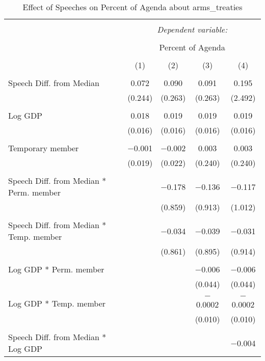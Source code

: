 
\begin{table}[!htbp] \centering 
  \caption{Effect of Speeches on Percent of Agenda about arms_treaties} 
  \label{} 
\begin{tabular}{@{\extracolsep{5pt}}lcccc} 
\\[-1.8ex]\hline 
\hline \\[-1.8ex] 
 & \multicolumn{4}{c}{\textit{Dependent variable:}} \\ 
\cline{2-5} 
\\[-1.8ex] & \multicolumn{4}{c}{Percent of Agenda} \\ 
\\[-1.8ex] & (1) & (2) & (3) & (4)\\ 
\hline \\[-1.8ex] 
 Speech Diff. from Median & 0.072 & 0.090 & 0.091 & 0.195 \\ 
  & (0.244) & (0.263) & (0.263) & (2.492) \\ 
  & & & & \\ 
 Log GDP & 0.018 & 0.019 & 0.019 & 0.019 \\ 
  & (0.016) & (0.016) & (0.016) & (0.016) \\ 
  & & & & \\ 
 Temporary member & $-$0.001 & $-$0.002 & 0.003 & 0.003 \\ 
  & (0.019) & (0.022) & (0.240) & (0.240) \\ 
  & & & & \\ 
 Speech Diff. from Median * Perm. member &  & $-$0.178 & $-$0.136 & $-$0.117 \\ 
  &  & (0.859) & (0.913) & (1.012) \\ 
  & & & & \\ 
 Speech Diff. from Median * Temp. member &  & $-$0.034 & $-$0.039 & $-$0.031 \\ 
  &  & (0.861) & (0.895) & (0.914) \\ 
  & & & & \\ 
 Log GDP * Perm. member &  &  & $-$0.006 & $-$0.006 \\ 
  &  &  & (0.044) & (0.044) \\ 
  & & & & \\ 
 Log GDP * Temp. member &  &  & $-$0.0002 & $-$0.0002 \\ 
  &  &  & (0.010) & (0.010) \\ 
  & & & & \\ 
 Speech Diff. from Median * Log GDP &  &  &  & $-$0.004 \\ 

\end{tabular}
\end{table}
